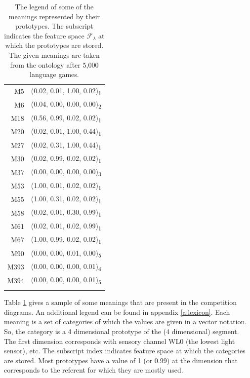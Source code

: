 \begin{table}
\centering
\begin{tabular}{rr}
\lsptoprule
M5 & (0.02, 0.01, 1.00, 0.02)\textsubscript{1}\\%
M6 & (0.04, 0.00, 0.00, 0.00)\textsubscript{2}\\%
M18 & (0.56, 0.99, 0.02, 0.02)\textsubscript{1}\\%
M20 & (0.02, 0.01, 1.00, 0.44)\textsubscript{1}\\%
M27 & (0.02, 0.31, 1.00, 0.44)\textsubscript{1}\\%
M30 & (0.02, 0.99, 0.02, 0.02)\textsubscript{1}\\%
M37 & (0.00, 0.00, 0.00, 0.00)\textsubscript{3}\\%
M53 & (1.00, 0.01, 0.02, 0.02)\textsubscript{1}\\%
M55 & (1.00, 0.31, 0.02, 0.02)\textsubscript{1}\\%
M58 & (0.02, 0.01, 0.30, 0.99)\textsubscript{1}\\%
M61 & (0.02, 0.01, 0.02, 0.99)\textsubscript{1}\\%
M67 & (1.00, 0.99, 0.02, 0.02)\textsubscript{1}\\%
M90 & (0.00, 0.00, 0.01, 0.00)\textsubscript{5}\\%
M393 & (0.00, 0.00, 0.00, 0.01)\textsubscript{4}\\%
M394 & (0.00, 0.00, 0.00, 0.01)\textsubscript{5}\\%
\lspbottomrule
\end{tabular}
\caption{The legend of some of the meanings represented by their prototypes. The subscript indicates the feature space ${\mathcal F}_\lambda$ at which the prototypes are stored. The given meanings are taken from the ontology after 5,000 language games.}
\label{t:st:legend}
\end{table}


Table \ref{t:st:legend} gives a sample of some meanings that are present in the competition diagrams. An additional legend can be found in appendix \ref{a:lexicon}. Each meaning is a set of categories of which the values are given in a vector notation. So, the category is a 4 dimensional prototype of the (4 dimensional) segment. The first dimension corresponds with sensory channel WL0 (the lowest light sensor), etc. The subscript index indicates feature space at which the categories are stored. Most prototypes have a value of 1 (or 0.99) at the dimension that corresponds to the referent for which they are mostly used. 

